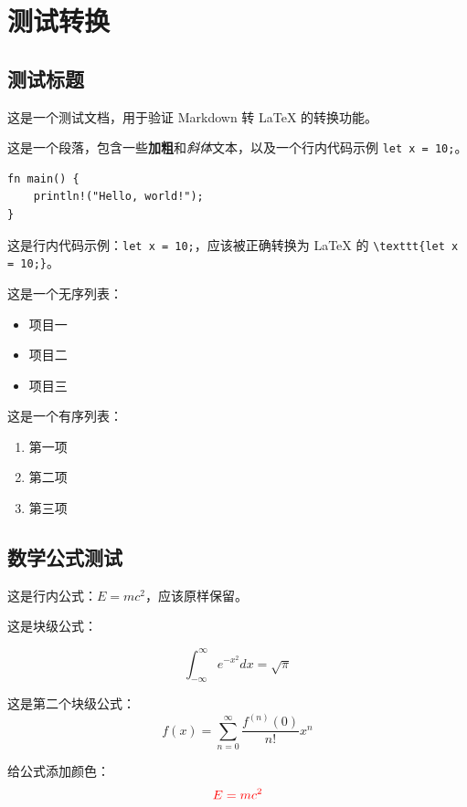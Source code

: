 \documentclass{ctexart}
\begin{document}
\section{测试转换}


\subsection{测试标题}

这是一个测试文档，用于验证 Markdown 转 LaTeX 的转换功能。

这是一个段落，包含一些\textbf{加粗}和\textit{斜体}文本，以及一个行内代码示例 \texttt{let x = 10;}。


\begin{verbatim}
fn main() {
    println!("Hello, world!");
}
\end{verbatim}

这是行内代码示例：\texttt{let x = 10;}，应该被正确转换为 LaTeX 的 \texttt{\textbackslash{}texttt\{let x = 10;\}}。

这是一个无序列表：


\begin{itemize}
\item 项目一
\item 项目二
\item 项目三
\end{itemize}

这是一个有序列表：


\begin{enumerate}
\item 第一项
\item 第二项
\item 第三项
\end{enumerate}


\subsection{数学公式测试}

这是行内公式：$E=mc^2$，应该原样保留。

这是块级公式：

\begin{equation*}
\int_{-\infty}^{\infty} e^{-x^2} dx = \sqrt{\pi}
\end{equation*}

这是第二个块级公式： \begin{equation*}
f(x) = \sum_{n=0}^{\infty} \frac{f^{(n)}(0)}{n!} x^n
\end{equation*}

给公式添加颜色： \begin{equation*}
\textcolor{red}{E=mc^2}
\end{equation*}
\end{document}

